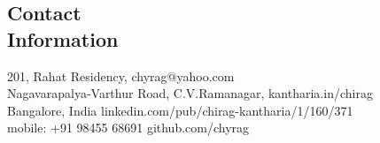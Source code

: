 \documentclass[margin,line]{resume}
\begin{document}
\begin{resume}
    \section{\mysidestyle Contact\\Information}

    201, Rahat Residency,  \hfill chyrag@yahoo.com \\
    Nagavarapalya-Varthur Road, C.V.Ramanagar, \hfill kantharia.in/chirag \\
    Bangalore, India  \hfill linkedin.com/pub/chirag-kantharia/1/160/371 \\
    mobile: +91 98455 68691  \hfill github.com/chyrag \\

\end{resume}
\end{document}
